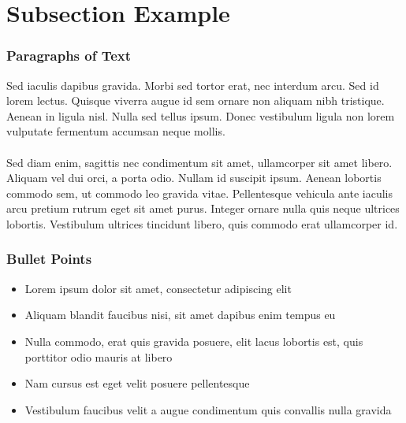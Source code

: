 \documentclass{beamer}
\begin{document}

\section{Subsection Example} %

\begin{frame}
\frametitle{Paragraphs of Text}
Sed iaculis dapibus gravida. Morbi sed tortor erat, nec interdum arcu. Sed id lorem lectus. Quisque viverra augue id sem ornare non aliquam nibh tristique. Aenean in ligula nisl. Nulla sed tellus ipsum. Donec vestibulum ligula non lorem vulputate fermentum accumsan neque mollis.\\~\\

Sed diam enim, sagittis nec condimentum sit amet, ullamcorper sit amet libero. Aliquam vel dui orci, a porta odio. Nullam id suscipit ipsum. Aenean lobortis commodo sem, ut commodo leo gravida vitae. Pellentesque vehicula ante iaculis arcu pretium rutrum eget sit amet purus. Integer ornare nulla quis neque ultrices lobortis. Vestibulum ultrices tincidunt libero, quis commodo erat ullamcorper id.
\end{frame}


\begin{frame}
\frametitle{Bullet Points}
\begin{itemize}
\item Lorem ipsum dolor sit amet, consectetur adipiscing elit
\item Aliquam blandit faucibus nisi, sit amet dapibus enim tempus eu
\item Nulla commodo, erat quis gravida posuere, elit lacus lobortis est, quis porttitor odio mauris at libero
\item Nam cursus est eget velit posuere pellentesque
\item Vestibulum faucibus velit a augue condimentum quis convallis nulla gravida
\end{itemize}
\end{frame}

\end{document}
